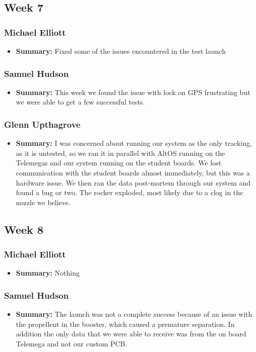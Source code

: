 \documentclass[onecolumn, draftclsnofoot,10pt, compsoc]{IEEEtran}
\begin{document}
\subsection{Week 7}
\subsubsection{Michael Elliott}
\begin{itemize}
 \item \textbf{Summary: } Fixed some of the issues encountered in the test launch
\end{itemize}
\subsubsection{Samuel Hudson}
\begin{itemize}
 \item \textbf{Summary: } This week we found the issue with lock on GPS frustrating but we were able to get a few successful tests.
\end{itemize}
\subsubsection{Glenn Upthagrove}
\begin{itemize}
 \item \textbf{Summary: } I was concerned about running our system as the only tracking, as it is untested, so we ran it in parallel with AltOS running on the Telemegas and our system running on the student boards. We lost communication with the student boards almost immediately, but this was a hardware issue. We then ran the data post-mortem through our system and found a bug or two. The rocker exploded, most likely due to a clog in the nozzle we believe. 
\end{itemize}
\subsection{Week 8}
\subsubsection{Michael Elliott}
\begin{itemize}
 \item \textbf{Summary: } Nothing
\end{itemize}
\subsubsection{Samuel Hudson}
\begin{itemize}
 \item \textbf{Summary: } The launch was not a complete success because of an issue with the propellent in the booster, which caused a premature separation. In addition the only data that we were able to receive was from the on board Telemega and not our custom PCB.
\end{itemize}
\end{document}
